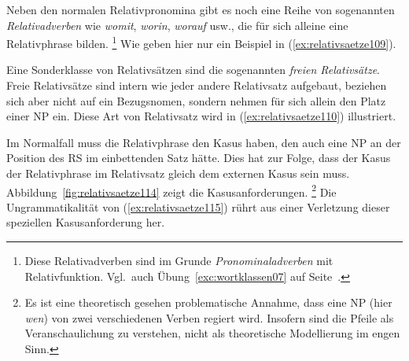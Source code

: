 
Neben den normalen Relativpronomina gibt es noch eine Reihe von sogenannten \textit{Relativadverben} wie \textit{womit}, \textit{worin}, \textit{worauf} usw., die für sich alleine eine Relativphrase bilden.%
\footnote{Diese Relativadverben sind im Grunde \textit{Pronominaladverben} mit Relativfunktion.
Vgl.\ auch Übung~\ref{exc:wortklassen07} auf Seite~\pageref{exc:wortklassen07}.}
Wie geben hier nur ein Beispiel in (\ref{ex:relativsaetze109}).

\Stretch[0.25]

\begin{exe}
\end{exe}

\Stretch[0.25]
\Enl[-1]

Eine Sonderklasse von Relativsätzen sind die sogenannten \textit{freien Relativsätze}.
Freie Relativsätze sind intern wie jeder andere Relativsatz aufgebaut, beziehen sich aber nicht auf ein Bezugsnomen, sondern nehmen für sich allein den Platz einer NP ein.
Diese Art von Relativsatz wird in (\ref{ex:relativsaetze110}) illustriert.

\begin{exe}
  \ex\label{ex:relativsaetze110}
  \begin{xlist}
  \end{xlist}
\end{exe}


Im Normalfall muss die Relativphrase den Kasus haben, den auch eine NP an der Position des RS im einbettenden Satz hätte.
Dies hat zur Folge, dass der Kasus der Relativphrase im Relativsatz gleich dem externen Kasus sein muss.
Abbildung~\ref{fig:relativsaetze114} zeigt die Kasusanforderungen.%
\footnote{Es ist eine theoretisch gesehen problematische Annahme, dass eine NP (hier \textit{wen}) von zwei verschiedenen Verben regiert wird.
Insofern sind die Pfeile als Veranschaulichung zu verstehen, nicht als theoretische Modellierung im engen Sinn.}
Die Ungrammatikalität von (\ref{ex:relativsaetze115}) rührt aus einer Verletzung dieser speziellen Kasusanforderung her.

